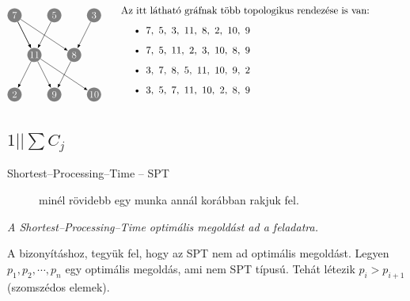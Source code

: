 \[ \parbox[l]{4cm}{
	\begin{tikzpicture}[scale=0.7]
	\tikzset{ p/.style={circle,white,fill=gray,inner sep=0pt,minimum size=0.5cm},
	}
	\node[p] (7) at (-2, 2) {$7$};
	\node[p] (5) at (0, 2) {$5$};
	\node[p] (3) at (2, 2) {$3$};
	\node[p] (11) at (-1, 0) {$11$};
	\node[p] (8) at (1, 0) {$8$};
	\node[p] (2) at (-2, -2) {$2$};
	\node[p] (9) at (0, -2) {$9$};
	\node[p] (10) at (2, -2) {$10$};

	\draw[-latex] (7) -- (11) node [midway, above] {};
	\draw[-latex] (7) -- (8) node [midway, above] {};
	\draw[-latex] (5) -- (11) node [midway, above] {};
	\draw[-latex] (3) -- (8) node [midway, above] {};
	\draw[-latex] (7) -- (11) node [midway, above] {};
	\draw[-latex] (11) -- (2) node [midway, above] {};
	\draw[-latex] (11) -- (9) node [midway, above] {};
	\draw[-latex] (11) -- (10) node [midway, above] {};
	\draw[-latex] (8) -- (9) node [midway, above] {};
	\end{tikzpicture}} %
	\parbox[l]{10cm}{
	Az itt látható gráfnak több topologikus rendezése is van:

	\begin{itemize}
	\item $7,~5,~3,~11,~8,~2,~10,~9$
	\item $7,~5,~11,~2,~3,~10,~8,~9$
	\item $3,~7,~8,~5,~11,~10,~9,~2$
	\item $3,~5,~7,~11,~10,~2,~8,~9$
	\end{itemize}
	}\]

\subsection{ \texorpdfstring{$ 1||\sum C_j$} {1||SumCj} }

\begin{description}
	\item[Shortest--Processing--Time -- SPT] minél rövidebb egy munka annál korábban
	      rakjuk fel.
\end{description}

\emph{A Shortest--Processing--Time optimális megoldást ad a feladatra.}
\vspace{0.4cm}

A bizonyításhoz, tegyük fel, hogy az SPT nem ad optimális megoldást. Legyen
$p_1, p_2, \cdots, p_n$ egy optimális megoldás, ami nem SPT típusú. Tehát
létezik $p_i>p_{i+1}$ (szomszédos elemek).

